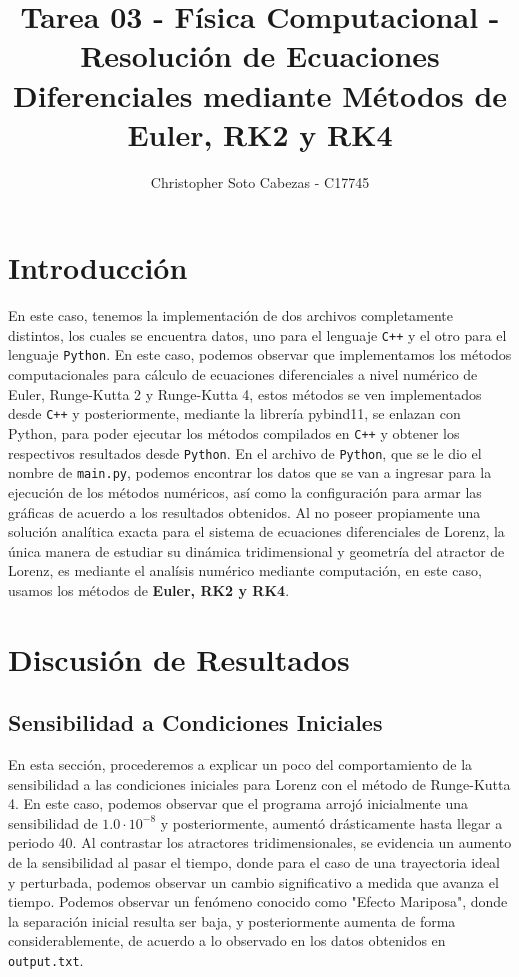 \documentclass[11pt,a4paper]{article}
\author{Christopher Soto Cabezas - C17745}
\title{Tarea 03 - Física Computacional - Resolución de Ecuaciones Diferenciales mediante Métodos de Euler, RK2 y RK4}
\begin{document}
\maketitle
\section*{Introducción}
En este caso, tenemos la implementación de dos archivos completamente distintos, los cuales se encuentra datos, uno para el lenguaje \texttt{C++} y el otro para el lenguaje \texttt{Python}. En este caso, podemos observar que implementamos los métodos computacionales para cálculo de ecuaciones diferenciales a nivel numérico de Euler, Runge-Kutta 2 y Runge-Kutta 4, estos métodos se ven implementados desde \texttt{C++} y posteriormente, mediante la librería pybind11, se enlazan con Python, para poder ejecutar los métodos compilados en \texttt{C++} y obtener los respectivos resultados desde \texttt{Python}. En el archivo de \texttt{Python}, que se le dio el nombre de \texttt{main.py}, podemos encontrar los datos que se van a ingresar para la ejecución de los métodos numéricos, así como la configuración para armar las gráficas de acuerdo a los resultados obtenidos. Al no poseer propiamente una solución analítica exacta para el sistema de ecuaciones diferenciales de Lorenz, la única manera de estudiar su dinámica tridimensional y geometría del atractor de Lorenz, es mediante el analísis numérico mediante computación, en este caso, usamos los métodos de \textbf{Euler, RK2 y RK4}.
\section*{Discusión de Resultados}

\subsection*{Sensibilidad a Condiciones Iniciales}

En esta sección, procederemos a explicar un poco del comportamiento de la sensibilidad a las condiciones iniciales para Lorenz con el método de Runge-Kutta 4. En este caso, podemos observar que el programa arrojó inicialmente una sensibilidad de $1.0 \cdot 10^{-8}$ y posteriormente, aumentó drásticamente hasta llegar a periodo 40. Al contrastar los atractores tridimensionales, se evidencia un aumento de la sensibilidad al pasar el tiempo, donde para el caso de una trayectoria ideal y perturbada, podemos observar un cambio significativo a medida que avanza el tiempo. Podemos observar un fenómeno conocido como "Efecto Mariposa", donde la separación inicial resulta ser baja, y posteriormente aumenta de forma considerablemente, de acuerdo a lo observado en los datos obtenidos en \texttt{output.txt}.  \\
\end{document}
